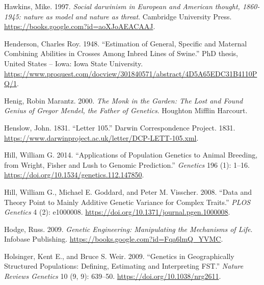 \documentclass[
]{book}
\newlength{\cslhangindent}
\newlength{\cslentryspacingunit} %
\newenvironment{CSLReferences}[2] %
 {%
  \setlength{\parindent}{0pt}
  \ifodd #1
  \let\oldpar\par
  \def\par{\hangindent=\cslhangindent\oldpar}
  \fi
  \setlength{\parskip}{#2\cslentryspacingunit}
 }%
 {}
\begin{document}
\begin{CSLReferences}{1}{0}
\leavevmode{}%
Hawkins, Mike. 1997. \emph{Social darwinism in European and American thought, 1860-1945: nature as model and nature as threat}. {Cambridge University Press}. \url{https://books.google.com?id=aoXJoAEACAAJ}.

\leavevmode{}%
Henderson, Charles Roy. 1948. {``Estimation of General, Specific and Maternal Combining Abilities in Crosses Among Inbred Lines of Swine.''} PhD thesis, {United States -- Iowa}: {Iowa State University}. \url{https://www.proquest.com/docview/301840571/abstract/4D5A65EDC31B4110PQ/1}.

\leavevmode{}%
Henig, Robin Marantz. 2000. \emph{The {Monk} in the {Garden}: {The Lost} and {Found Genius} of {Gregor Mendel}, the {Father} of {Genetics}}. {Houghton Mifflin Harcourt}.

\leavevmode{}%
Henslow, John. 1831. {``Letter 105.''} {Darwin Correspondence Project}. 1831. \url{https://www.darwinproject.ac.uk/letter/DCP-LETT-105.xml}.

\leavevmode{}%
Hill, William G. 2014. {``Applications of {Population Genetics} to {Animal Breeding}, from {Wright}, {Fisher} and {Lush} to {Genomic Prediction}.''} \emph{Genetics} 196 (1): 1--16. \url{https://doi.org/10.1534/genetics.112.147850}.

\leavevmode{}%
Hill, William G., Michael E. Goddard, and Peter M. Visscher. 2008. {``Data and {Theory Point} to {Mainly Additive Genetic Variance} for {Complex Traits}.''} \emph{PLOS Genetics} 4 (2): e1000008. \url{https://doi.org/10.1371/journal.pgen.1000008}.

\leavevmode{}%
Hodge, Russ. 2009. \emph{Genetic {Engineering}: {Manipulating} the {Mechanisms} of {Life}}. {Infobase Publishing}. \url{https://books.google.com?id=Fqa6lmQ_YVMC}.

\leavevmode{}%
Holsinger, Kent E., and Bruce S. Weir. 2009. {``Genetics in Geographically Structured Populations: Defining, Estimating and Interpreting {FST}.''} \emph{Nature Reviews Genetics} 10 (9, 9): 639--50. \url{https://doi.org/10.1038/nrg2611}.


\end{CSLReferences}
\end{document}
